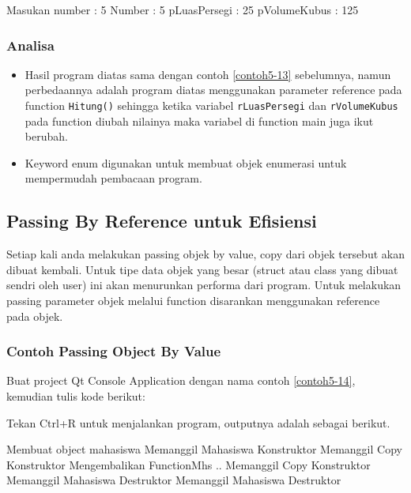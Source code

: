 \begin{lcverbatim}
Masukan number : 5
Number : 5
pLuasPersegi : 25
pVolumeKubus : 125
\end{lcverbatim}

\subsubsection*{Analisa}

\begin{itemize}

\item
 Hasil program diatas sama dengan contoh \ref{contoh5-13} sebelumnya, namun
 perbedaannya adalah program diatas menggunakan parameter reference
 pada function \texttt{Hitung()} sehingga ketika variabel
 \texttt{rLuasPersegi} dan \texttt{rVolumeKubus} pada function diubah
 nilainya maka variabel di function main juga ikut berubah.
\item
 Keyword enum digunakan untuk membuat objek enumerasi untuk mempermudah
 pembacaan program.
\end{itemize}

\subsection{Passing By Reference untuk Efisiensi}\label{passing-by-reference-untuk-efisiensi}

Setiap kali anda melakukan passing objek by value, copy dari objek
tersebut akan dibuat kembali. Untuk tipe data objek yang besar (struct
atau class yang dibuat sendri oleh user) ini akan menurunkan performa
dari program. Untuk melakukan passing parameter objek melalui function
disarankan menggunakan reference pada objek.

\subsubsection*{Contoh Passing Object By Value}

Buat project Qt Console Application dengan nama contoh \ref{contoh5-14}, kemudian
tulis kode berikut:



Tekan Ctrl+R untuk menjalankan program, outputnya adalah sebagai
berikut.

\begin{lcverbatim}
Membuat object mahasiswa
Memanggil Mahasiswa Konstruktor
Memanggil Copy Konstruktor
Mengembalikan FunctionMhs ..
Memanggil Copy Konstruktor
Memanggil Mahasiswa Destruktor
Memanggil Mahasiswa Destruktor
\end{lcverbatim}

